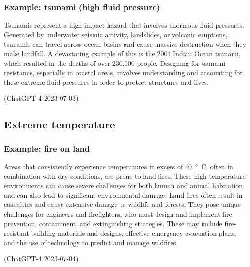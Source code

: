 \subsubsection{Example: tsunami (high fluid pressure)}
\begin{quoting}
    Tsunamis represent a high-impact hazard that involves enormous fluid pressures. Generated by underwater seismic activity, landslides, or volcanic eruptions, tsunamis can travel across ocean basins and cause massive destruction when they make landfall. A devastating example of this is the 2004 Indian Ocean tsunami, which resulted in the deaths of over 230,000 people. Designing for tsunami resistance, especially in coastal areas, involves understanding and accounting for these extreme fluid pressures in order to protect structures and lives.

    (ChatGPT-4 2023-07-03)
\end{quoting}
\subsection{Extreme temperature}
\subsubsection{Example: fire on land}
\begin{quoting}
    Areas that consistently experience temperatures in excess of \SI{40}{\degree C}, often in combination with dry conditions, are prone to land fires. These high-temperature environments can cause severe challenges for both human and animal habitation, and can also lead to significant environmental damage. Land fires often result in casualties and cause extensive damage to wildlife and forests. They pose unique challenges for engineers and firefighters, who must design and implement fire prevention, containment, and extinguishing strategies. These may include fire-resistant building materials and designs, effective emergency evacuation plans, and the use of technology to predict and manage wildfires.

    (ChatGPT-4 2023-07-04)
\end{quoting}
